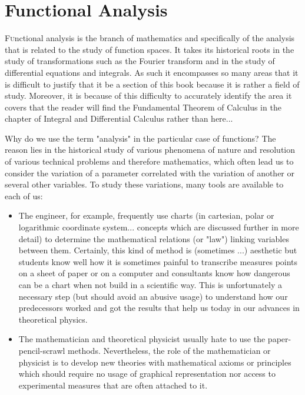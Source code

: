 	\newpage
	\thispagestyle{empty}
	\mbox{}
	\section{Functional Analysis}\label{functional analysis}
\lettrine[lines=4]{\color{BrickRed}F}unctional analysis is the branch of mathematics and specifically of the analysis that is related to the study of function spaces. It takes its historical roots in the study of transformations such as the Fourier transform and in the study of differential equations and integrals. As such it encompasses so many areas that it is difficult to justify that it be a section of this book because it is rather a field of study. Moreover, it is because of this difficulty to accurately identify the area it covers that the reader will find the Fundamental Theorem of Calculus in the chapter of Integral and Differential Calculus rather than here... 

	Why do we use the term "analysis" in the particular case of functions? The reason lies in the historical study of various phenomena of nature and resolution of various technical problems and therefore mathematics, which often lead us to consider the variation of a parameter correlated with the variation of another or several other variables. To study these variations, many tools are available to each of us:
\begin{itemize}
	\item The engineer, for example, frequently use charts (in cartesian, polar or logarithmic coordinate system... concepts which are discussed further in more detail) to determine the mathematical relations (or "law") linking variables between them. Certainly, this kind of method is (sometimes ...) aesthetic but students know well how it is sometimes painful to transcribe measures points on a sheet of paper or on a computer and consultants know how dangerous can be a chart when not build in a scientific way. This is unfortunately a necessary step (but should avoid an abusive usage) to understand how our predecessors worked and got the results that help us today in our advances in theoretical physics.
	
	\item The mathematician and theoretical physicist usually hate to use the paper-pencil-scrawl methods. Nevertheless, the role of the mathematician or physicist is to develop new theories with mathematical axioms or principles which should require no usage of graphical representation nor access to experimental  measures that are often attached to it.
\end{itemize}

